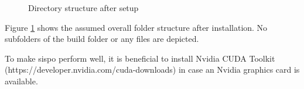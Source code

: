 \begin{figure}
    \caption{Directory structure after setup}
    \label{fig:dir_tree}
\end{figure}
Figure \ref{fig:dir_tree} shows the assumed overall folder structure after installation. No subfolders of the build folder or any files are depicted. 

To make \gls{sispo} perform well, it is beneficial to install Nvidia CUDA Toolkit (https://developer.nvidia.com/cuda-downloads) in case an Nvidia graphics card is available.

